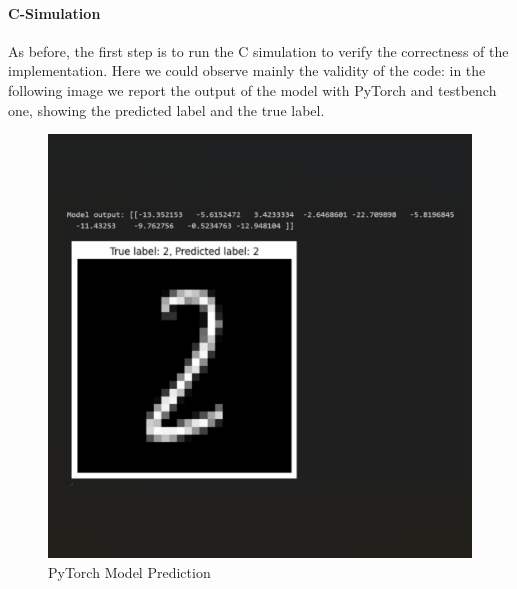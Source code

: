 \documentclass{article}
\begin{document}
\paragraph{C-Simulation}
As before, the first step is to run the C simulation to verify the correctness of the implementation. Here we could observe mainly the validity of the code: in the following image we report the output of the model with PyTorch and testbench one, showing the predicted label and the true label.

\begin{figure}[H]
    \centering
    \begin{minipage}{0.49\textwidth}
        \centering
        \includegraphics[width=1\textwidth]{assets/ConvNet/torch-prediction.png}
        \caption{PyTorch Model Prediction}
        \label{fig:convnet-torch-prediction}
    \end{minipage}
    \hfill
    \begin{minipage}{0.49\textwidth}
        \centering

\end{minipage}
\end{figure}
\end{document}
